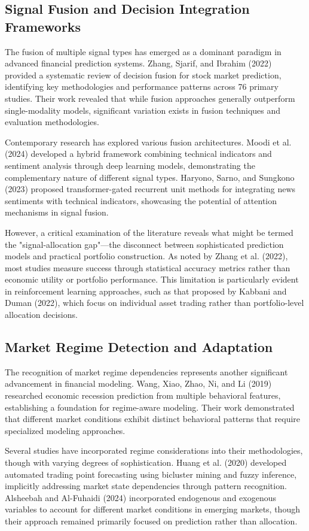 \documentclass{singlecol-new}
\theoremstyle{TH}{
\newtheorem{lemma}{Lemma}
\newtheorem{theorem}[lemma]{Theorem}
\newtheorem{corrolary}[lemma]{Corrolary}
\newtheorem{conjecture}[lemma]{Conjecture}
\newtheorem{proposition}[lemma]{Proposition}
\newtheorem{claim}[lemma]{Claim}
\newtheorem{stheorem}[lemma]{Wrong Theorem}
\newtheorem{algorithm}{Algorithm}
}
\theoremstyle{THrm}{
\newtheorem{definition}{Definition}[section]
\newtheorem{question}{Question}[section]
\newtheorem{remark}{Remark}
\newtheorem{scheme}{Scheme}
}
\theoremstyle{THhit}{
\newtheorem{case}{Case}[section]
}
\begin{document}
\subsection{Signal Fusion and Decision Integration Frameworks}
The fusion of multiple signal types has emerged as a dominant paradigm in advanced financial prediction systems. Zhang, Sjarif, and Ibrahim (2022) provided a systematic review of decision fusion for stock market prediction, identifying key methodologies and performance patterns across 76 primary studies. Their work revealed that while fusion approaches generally outperform single-modality models, significant variation exists in fusion techniques and evaluation methodologies.

Contemporary research has explored various fusion architectures. Moodi et al. (2024) developed a hybrid framework combining technical indicators and sentiment analysis through deep learning models, demonstrating the complementary nature of different signal types. Haryono, Sarno, and Sungkono (2023) proposed transformer-gated recurrent unit methods for integrating news sentiments with technical indicators, showcasing the potential of attention mechanisms in signal fusion.

However, a critical examination of the literature reveals what might be termed the "signal-allocation gap"—the disconnect between sophisticated prediction models and practical portfolio construction. As noted by Zhang et al. (2022), most studies measure success through statistical accuracy metrics rather than economic utility or portfolio performance. This limitation is particularly evident in reinforcement learning approaches, such as that proposed by Kabbani and Duman (2022), which focus on individual asset trading rather than portfolio-level allocation decisions.

\subsection{Market Regime Detection and Adaptation}
The recognition of market regime dependencies represents another significant advancement in financial modeling. Wang, Xiao, Zhao, Ni, and Li (2019) researched economic recession prediction from multiple behavioral features, establishing a foundation for regime-aware modeling. Their work demonstrated that different market conditions exhibit distinct behavioral patterns that require specialized modeling approaches.

Several studies have incorporated regime considerations into their methodologies, though with varying degrees of sophistication. Huang et al. (2020) developed automated trading point forecasting using bicluster mining and fuzzy inference, implicitly addressing market state dependencies through pattern recognition. Alsheebah and Al-Fuhaidi (2024) incorporated endogenous and exogenous variables to account for different market conditions in emerging markets, though their approach remained primarily focused on prediction rather than allocation.
\end{document}
